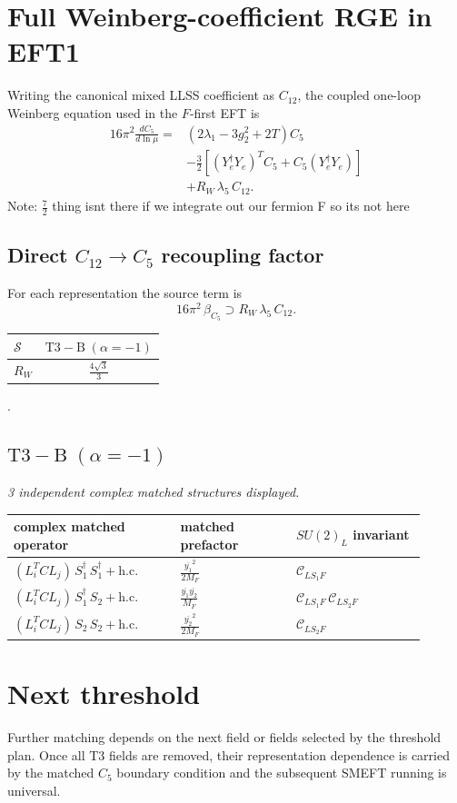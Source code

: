 \documentclass[9pt]{article}
\begin{document}
\section*{Full Weinberg-coefficient RGE in EFT1}
Writing the canonical mixed LLSS coefficient as $C_{12}$, the coupled one-loop Weinberg equation used in the $F$-first EFT is
\begin{align}
16\pi^2\frac{dC_5}{d\ln\mu}={}&(2\lambda_1-3g_2^2+2T)C_5\\
&-\frac32\left[(Y_e^\dagger Y_e)^T C_5+C_5(Y_e^\dagger Y_e)\right]\\
&+R_W\,\lambda_5\,C_{12}.
\end{align}
Note: $\frac{7}{2}$ thing isnt there if we integrate out our fermion F so its not here \subsection*{Direct $C_{12}\to C_5$ recoupling factor}
For each representation the source term is
\[16\pi^2\,\beta_{C_5}\supset R_W\,\lambda_5\,C_{12}.\]
\begin{longtable}{@{}lc@{}}
\toprule
$\mathcal{S}$ & $ \mathrm{T3-B}\;(\alpha=-1) $ \\
\midrule
$R_W$ & $ \frac{4 \sqrt{3}}{3} $ \\
\bottomrule
\end{longtable}
.
\subsection*{$ \mathrm{T3-B}\;(\alpha=-1) $}
\textit{3 independent complex matched structures displayed. }
\begin{longtable}{@{}p{0.36\linewidth}p{0.25\linewidth}p{0.29\linewidth}@{}}
\toprule
complex matched operator & matched prefactor & $SU(2)_L$ invariant \\
\midrule
$ (L_i^T C L_j)\,S_1^\dagger\,S_1^\dagger+\mathrm{h.c.} $ & $ \frac{\overline{y_{1}}^{2}}{2 M_F} $ & $ \mathcal{C}_{LS_1F} $ \\
$ (L_i^T C L_j)\,S_1^\dagger\,S_2+\mathrm{h.c.} $ & $ \frac{\overline{y_{1}} \overline{y_{2}}}{M_F} $ & $ \mathcal{C}_{LS_1F}\,\mathcal{C}_{LS_2F} $ \\
$ (L_i^T C L_j)\,S_2\,S_2+\mathrm{h.c.} $ & $ \frac{\overline{y_{2}}^{2}}{2 M_F} $ & $ \mathcal{C}_{LS_2F} $ \\
\bottomrule
\end{longtable}
\section*{Next threshold}
Further matching depends on the next field or fields selected by the threshold plan.  Once all T3 fields are removed, their representation dependence is carried by the matched $C_5$ boundary condition and the subsequent SMEFT running is universal.
\end{document}
